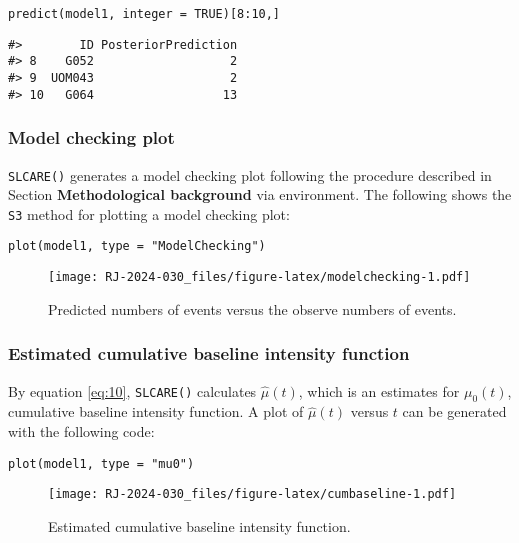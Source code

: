 \begin{verbatim}
predict(model1, integer = TRUE)[8:10,]
\end{verbatim}

\begin{verbatim}
#>        ID PosteriorPrediction
#> 8    G052                   2
#> 9  UOM043                   2
#> 10   G064                  13
\end{verbatim}

\hypertarget{model-checking-plot}{%
\subsubsection{Model checking plot}\label{model-checking-plot}}

\texttt{SLCARE()} generates a model checking plot following the procedure described in Section \textbf{Methodological background} via  environment. The following shows the \texttt{S3} method for plotting a model checking plot:

\begin{verbatim}
plot(model1, type = "ModelChecking")
\end{verbatim}

\begin{figure}
\centering
\texttt{[image: RJ-2024-030\_files/figure-latex/modelchecking-1.pdf]}
\caption{\label{fig:modelchecking}Predicted numbers of events versus the observe numbers of events.}
\end{figure}

\hypertarget{estimated-cumulative-baseline-intensity-function}{%
\subsubsection{Estimated cumulative baseline intensity function}\label{estimated-cumulative-baseline-intensity-function}}

By equation \eqref{eq:10}, \texttt{SLCARE()} calculates \(\hat{\mu}(t)\), which is an estimates for \(\mu _{0} (t)\), cumulative baseline intensity function. A plot of \(\hat{\mu}(t)\) versus \(t\) can be generated with the following code:

\begin{verbatim}
plot(model1, type = "mu0")
\end{verbatim}

\begin{figure}
\centering
\texttt{[image: RJ-2024-030\_files/figure-latex/cumbaseline-1.pdf]}
\caption{\label{fig:cumbaseline}Estimated cumulative baseline intensity function.}
\end{figure}

